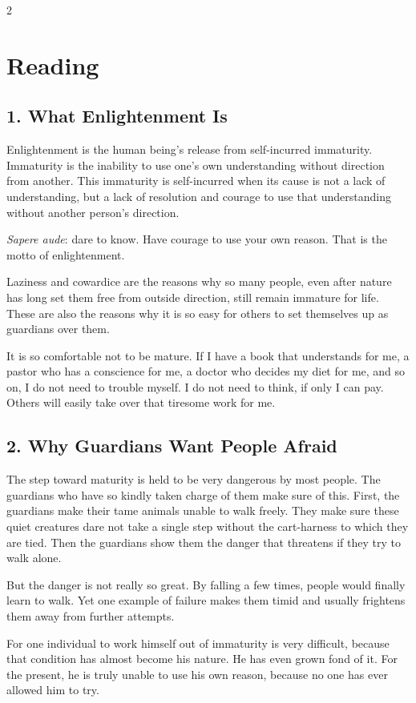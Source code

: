 \documentclass[12pt]{article}
\begin{document}
\begin{multicols}{2}
\raggedcolumns
\section*{Reading}

\subsection*{1. What Enlightenment Is}
Enlightenment is the human being's release from self-incurred immaturity. Immaturity is the inability to use one's own understanding without direction from another. This immaturity is self-incurred when its cause is not a lack of understanding, but a lack of resolution and courage to use that understanding without another person's direction.

\textit{Sapere aude}: dare to know. Have courage to use your own reason. That is the motto of enlightenment.

Laziness and cowardice are the reasons why so many people, even after nature has long set them free from outside direction, still remain immature for life. These are also the reasons why it is so easy for others to set themselves up as guardians over them.

It is so comfortable not to be mature. If I have a book that understands for me, a pastor who has a conscience for me, a doctor who decides my diet for me, and so on, I do not need to trouble myself. I do not need to think, if only I can pay. Others will easily take over that tiresome work for me.

\subsection*{2. Why Guardians Want People Afraid}
The step toward maturity is held to be very dangerous by most people. The guardians who have so kindly taken charge of them make sure of this. First, the guardians make their tame animals unable to walk freely. They make sure these quiet creatures dare not take a single step without the cart-harness to which they are tied. Then the guardians show them the danger that threatens if they try to walk alone.

But the danger is not really so great. By falling a few times, people would finally learn to walk. Yet one example of failure makes them timid and usually frightens them away from further attempts.

For one individual to work himself out of immaturity is very difficult, because that condition has almost become his nature. He has even grown fond of it. For the present, he is truly unable to use his own reason, because no one has ever allowed him to try.


\end{multicols}
\end{document}
